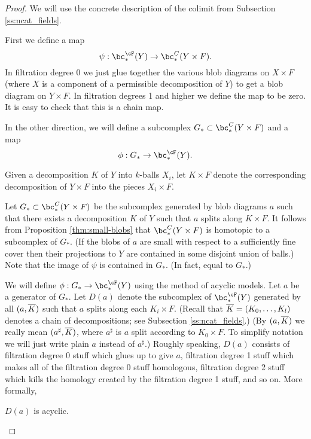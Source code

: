 \begin{proof}%
We will use the concrete description of the colimit from Subsection \ref{ss:ncat_fields}.

First we define a map 
\[
	\psi: \bc_*^\cF(Y) \to \bc_*^C(Y\times F) .
\]
In filtration degree 0 we just glue together the various blob diagrams on $X\times F$
(where $X$ is a component of a permissible decomposition of $Y$) to get a blob diagram on
$Y\times F$.
In filtration degrees 1 and higher we define the map to be zero.
It is easy to check that this is a chain map.

In the other direction, we will define a subcomplex $G_*\sub \bc_*^C(Y\times F)$
and a map
\[
	\phi: G_* \to \bc_*^\cF(Y) .
\]

Given a decomposition $K$ of $Y$ into $k$-balls $X_i$, let $K\times F$ denote the corresponding
decomposition of $Y\times F$ into the pieces $X_i\times F$.

Let $G_*\sub \bc_*^C(Y\times F)$ be the subcomplex generated by blob diagrams $a$ such that there
exists a decomposition $K$ of $Y$ such that $a$ splits along $K\times F$.
It follows from Proposition \ref{thm:small-blobs} that $\bc_*^C(Y\times F)$ is homotopic to a subcomplex of $G_*$.
(If the blobs of $a$ are small with respect to a sufficiently fine cover then their
projections to $Y$ are contained in some disjoint union of balls.)
Note that the image of $\psi$ is contained in $G_*$.
(In fact, equal to $G_*$.)

We will define $\phi: G_* \to \bc_*^\cF(Y)$ using the method of acyclic models.
Let $a$ be a generator of $G_*$.
Let $D(a)$ denote the subcomplex of $\bc_*^\cF(Y)$ generated by all $(a, \overline{K})$
such that $a$ splits along each $K_i\times F$.
(Recall that $\overline{K} = (K_0,\ldots,K_l)$ denotes a chain of decompositions;
see Subsection \ref{ss:ncat_fields}.)
(By $(a, \overline{K})$ we really mean $(a^\sharp, \overline{K})$, where $a^\sharp$ is 
$a$ split according to $K_0\times F$.
To simplify notation we will just write plain $a$ instead of $a^\sharp$.)
Roughly speaking, $D(a)$ consists of filtration degree 0 stuff which glues up to give
$a$, filtration degree 1 stuff which makes all of the filtration degree 0 stuff homologous, 
filtration degree 2 stuff which kills the homology created by the 
filtration degree 1 stuff, and so on.
More formally,
 
\begin{lemma}
$D(a)$ is acyclic.
\end{lemma}


\end{proof}

